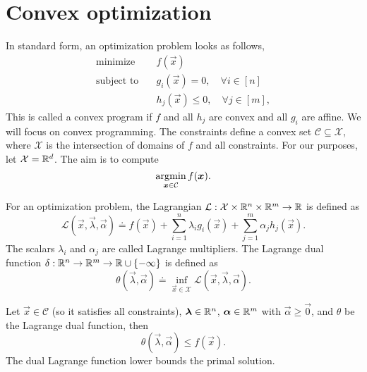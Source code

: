 \section{Convex optimization}

In standard form, an optimization problem looks as follows,
\begin{align*}
    \text{minimize}   & \quad f(\vec{x})                                    \\
    \text{subject to} & \quad g_i(\vec{x}) = 0, \quad \forall i \in [n]     \\
                      & \quad h_j(\vec{x}) \leq 0, \quad \forall j \in [m],
\end{align*}
This is called a convex program if $f$ and all $h_j$ are convex and all $g_i$ are affine.
We will focus on convex programming. The constraints define a convex set
$\mathcal{C} \subseteq \mathcal{X}$, where $\mathcal{X}$ is the intersection of domains of $f$ and
all constraints. For our purposes, let $\mathcal{X} = \mathbb{R}^d$. The aim is to compute \[
    \operatorname*{argmin}_{\bm{x} \in \mathcal{C}} f(\bm{x}).
\]

\begin{definition}
    For an optimization problem, the Lagrangian $\mathcal{L}: \mathcal{X} \times \mathbb{R}^n \times \mathbb{R}^m \to \mathbb{R}$ is defined as \[
        \mathcal{L}(\vec{x}, \vec{\lambda}, \vec{\alpha}) \doteq f(\vec{x}) + \sum_{i=1}^{n} \lambda_i g_i(\vec{x}) + \sum_{j=1}^{m} \alpha_j h_j(\vec{x}).
    \]
    The scalars $\lambda_i$ and $\alpha_j$ are called Lagrange multipliers. The Lagrange dual function
    $\delta: \mathbb{R}^n \to \mathbb{R}^m \to \mathbb{R} \cup \{ -\infty \}$ is defined as \[
        \theta(\vec{\lambda}, \vec{\alpha}) \doteq \inf_{\vec{x} \in \mathcal{X}} \mathcal{L}(\vec{x}, \vec{\lambda}, \vec{\alpha}).
    \]
\end{definition}

\begin{lemma} \label{lem:weak-duality}
    Let $\vec{x} \in \mathcal{C}$ (so it satisfies all constraints), $\bm{\lambda} \in \mathbb{R}^n$, $\bm{\alpha} \in \mathbb{R}^m$ with $\vec{\alpha} \geq \vec{0}$, and $\theta$ be the Lagrange dual function, then \[
        \theta(\vec{\lambda}, \vec{\alpha}) \leq f(\vec{x}).
    \]
    The dual Lagrange function lower bounds the primal solution.
\end{lemma}

